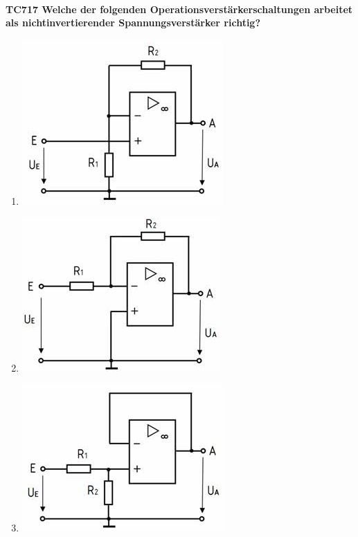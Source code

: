 \documentclass[8pt]{article}
\begin{document}
\begin{enumerate}
\begin{enumerate}[nolistsep,label=\Alph*]
{\begin{enumerate}[nolistsep,label=\Alph*]
\paragraph*{TC717 Welche der folgenden Operationsverstärkerschaltungen arbeitet als nichtinvertierender Spannungsverstärker richtig?}
\begin{enumerate}[nolistsep,label=\Alph*]
\item
\begin{center}
	\begin{minipage}{\linewidth}
		\centering
		\includegraphics[scale=1.0]{pics/tc717_a.jpg}
	\end{minipage}
\end{center}
\item
\begin{center}
	\begin{minipage}{\linewidth}
		\centering
		\includegraphics[scale=1.0]{pics/tc717_b.jpg}
	\end{minipage}
\end{center}
\item
\begin{center}
	\begin{minipage}{\linewidth}
		\centering
		\includegraphics[scale=1.0]{pics/tc717_c.jpg}

\end{minipage}
\end{center}
\end{enumerate}
\end{enumerate}}
\end{enumerate}
\end{enumerate}
\end{document}
